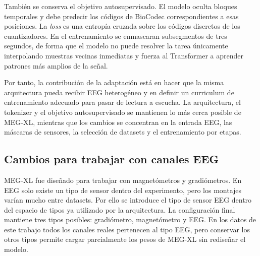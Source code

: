 También se conserva el objetivo autosupervisado. El modelo oculta bloques temporales y debe predecir los códigos de BioCodec correspondientes a esas posiciones. La \textit{loss} es una entropía cruzada sobre los códigos discretos de los cuantizadores. En el entrenamiento se enmascaran subsegmentos de tres segundos, de forma que el modelo no puede resolver la tarea únicamente interpolando muestras vecinas inmediatas y fuerza al Transformer a aprender patrones más amplios de la señal.

Por tanto, la contribución de la adaptación está en hacer que la misma arquitectura pueda recibir EEG heterogéneo y en definir un curriculum de entrenamiento adecuado para pasar de lectura a escucha. La arquitectura, el tokenizer y el objetivo autosupervisado se mantienen lo más cerca posible de MEG-XL, mientras que los cambios se concentran en la entrada EEG, las máscaras de sensores, la selección de datasets y el entrenamiento por etapas.

\subsection{Cambios para trabajar con canales EEG}


MEG-XL fue diseñado para trabajar con magnetómetros y gradiómetros. En EEG solo existe un tipo de sensor dentro del experimento, pero los montajes varían mucho entre datasets. Por ello se introduce el tipo de sensor EEG dentro del espacio de tipos ya utilizado por la arquitectura. La configuración final mantiene tres tipos posibles: gradiómetro, magnetómetro y EEG. En los datos de este trabajo todos los canales reales pertenecen al tipo EEG, pero conservar los otros tipos permite cargar parcialmente los pesos de MEG-XL sin rediseñar el modelo.


